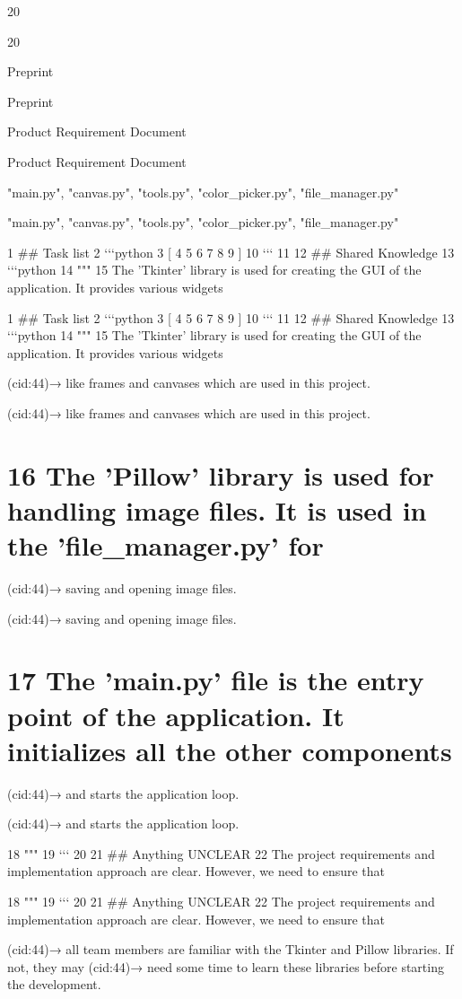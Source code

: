 \documentclass[12pt]{article}
\begin{document}
20


20


Preprint


Preprint


Product Requirement Document


Product Requirement Document


"main.py",
"canvas.py",
"tools.py",
"color_picker.py",
"file_manager.py"


"main.py",
"canvas.py",
"tools.py",
"color\_picker.py",
"file\_manager.py"


1 ## Task list
2 ‘‘‘python
3 [
4
5
6
7
8
9 ]
10 ‘‘‘
11
12 ## Shared Knowledge
13 ‘‘‘python
14 """
15 The ’Tkinter’ library is used for creating the GUI of the application. It provides various widgets


1 \#\# Task list
2 ‘‘‘python
3 [
4
5
6
7
8
9 ]
10 ‘‘‘
11
12 \#\# Shared Knowledge
13 ‘‘‘python
14 """
15 The ’Tkinter’ library is used for creating the GUI of the application. It provides various widgets


(cid:44)→ like frames and canvases which are used in this project.


(cid:44)→ like frames and canvases which are used in this project.


\section{16 The ’Pillow’ library is used for handling image files. It is used in the ’file_manager.py’ for}


(cid:44)→ saving and opening image files.


(cid:44)→ saving and opening image files.


\section{17 The ’main.py’ file is the entry point of the application. It initializes all the other components}


(cid:44)→ and starts the application loop.


(cid:44)→ and starts the application loop.


18 """
19 ‘‘‘
20
21 ## Anything UNCLEAR
22 The project requirements and implementation approach are clear. However, we need to ensure that


18 """
19 ‘‘‘
20
21 \#\# Anything UNCLEAR
22 The project requirements and implementation approach are clear. However, we need to ensure that


(cid:44)→ all team members are familiar with the Tkinter and Pillow libraries. If not, they may
(cid:44)→ need some time to learn these libraries before starting the development.
\end{document}
